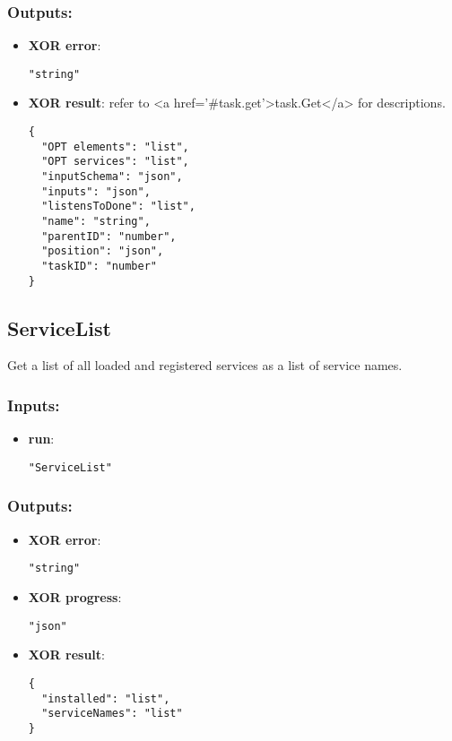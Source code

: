 \subsubsection*{Outputs:}
\begin{itemize}
    \item \textbf{XOR error}: 
\begin{lstlisting}
"string"
\end{lstlisting}
    \item \textbf{XOR result}: refer to <a href='\#task.get'>task.Get</a> for descriptions.
\begin{lstlisting}
{
  "OPT elements": "list", 
  "OPT services": "list", 
  "inputSchema": "json", 
  "inputs": "json", 
  "listensToDone": "list", 
  "name": "string", 
  "parentID": "number", 
  "position": "json", 
  "taskID": "number"
}
\end{lstlisting}
  \end{itemize}

\subsection{ServiceList}
Get a list of all loaded and registered services as a list of service names.
\subsubsection*{Inputs:}
\begin{itemize}
    \item \textbf{run}: 
\begin{lstlisting}
"ServiceList"
\end{lstlisting}
  \end{itemize}

\subsubsection*{Outputs:}
\begin{itemize}
    \item \textbf{XOR error}: 
\begin{lstlisting}
"string"
\end{lstlisting}
    \item \textbf{XOR progress}: 
\begin{lstlisting}
"json"
\end{lstlisting}
    \item \textbf{XOR result}: 
\begin{lstlisting}
{
  "installed": "list", 
  "serviceNames": "list"
}
\end{lstlisting}
  \end{itemize}

